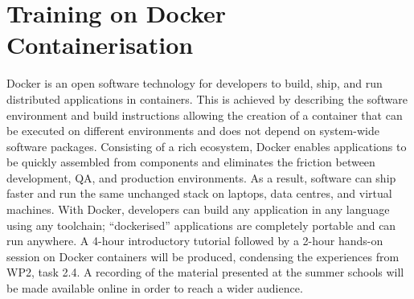 \section{Training on Docker Containerisation}

Docker is an open software technology for developers to build, ship, and run distributed applications in containers. This is achieved by describing the software environment and build instructions allowing the creation of a container that can be executed on different environments and does not depend on system-wide software packages. Consisting of a rich ecosystem, Docker enables applications to be quickly assembled from components and eliminates the friction between development, QA, and production environments. As a result, software can ship faster and run the same unchanged stack on laptops, data centres, and virtual machines. With Docker, developers can build any application in any language using any toolchain; “dockerised” applications are completely portable and can run anywhere. A 4-hour introductory tutorial followed by a 2-hour hands-on session on Docker containers will be produced, condensing the experiences from WP2, task 2.4. A recording of the material presented at the summer schools will be made available online in order to reach a wider audience.
